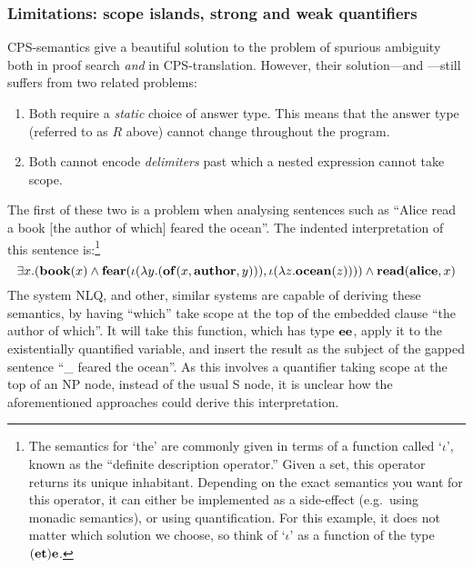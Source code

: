 \subsubsection{Limitations: scope islands, strong and weak quantifiers}
 CPS-semantics give a beautiful solution to the
problem of spurious ambiguity both in proof search \emph{and} in
CPS-translation. However, their solution---and
---still suffers from two related problems:
\begin{enumerate}
\item Both require a \emph{static} choice of answer type. This
  means that the answer type (referred to as $R$ above) cannot change
  throughout the program.
\item Both cannot encode \emph{delimiters} past which a nested
  expression cannot take scope.
\end{enumerate}

The first of these two is a problem when analysing sentences such as
``Alice read a book [the author of which] feared the ocean''. The
indented interpretation of this sentence is:\footnote{%
  The semantics for `the' are commonly given in terms of a function
  called `$\iota$', known as the ``definite description operator.''
  Given a set, this operator returns its unique inhabitant. Depending
  on the exact semantics you want for this operator, it can either be
  implemented as a side-effect (e.g.\ using monadic semantics), or
  using quantification. For this example, it does not matter which
  solution we choose, so think of `$\iota$' as a function of the type
  $(\mathbf{e}\mathbf{t})\mathbf{e}$.
}
\[
  \exists x.(\mathbf{book}(x)\wedge \mathbf{fear}(\iota(\lambda
  y.(\mathbf{of}(x,\mathbf{author},y))),\iota(\lambda z.\mathbf{ocean}(z))))\wedge\mathbf{read}(\mathbf{alice},x)
\]
The system NLQ, and other, similar systems are capable of deriving
these semantics, by having ``which'' take scope at the top of the
embedded clause ``the author of which''. It will take this function,
which has type $\mathbf{e}\mathbf{e}$, apply it to the existentially quantified
variable, and insert the result as the subject of the gapped sentence
``\_ feared the ocean''. As this involves a quantifier taking scope at
the top of an NP node, instead of the usual S node, it is unclear how
the aforementioned approaches could derive this interpretation.

